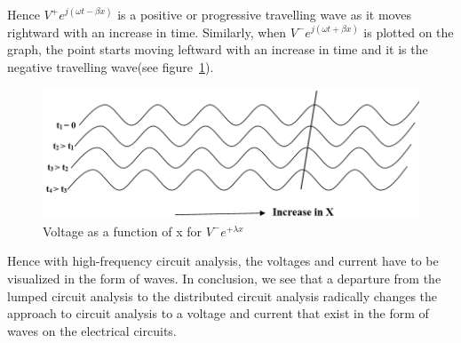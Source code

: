 Hence  $ V^{+}e^{j(\omega t- \beta x )} $ is a positive or progressive travelling wave as it moves rightward with an increase in time. Similarly, when $ V^{-}e^{j( \omega t+ \beta x )} $ is plotted on the graph, the point starts moving leftward with an increase in time and it is the negative travelling wave(see figure~\ref{fig:abcd}).
\begin{figure}[h]
\centering
\includegraphics[width=1\linewidth]{graphics/ABCD}
\caption{Voltage as a function of x for $V^-e^{+\lambda x}$}
\label{fig:abcd}
\end{figure}

Hence with high-frequency circuit analysis, the voltages and current have to be visualized in the form of waves. In conclusion, we see that a departure from the lumped circuit analysis to the distributed circuit analysis radically changes the approach to circuit analysis to a voltage and current that exist in the form of waves on the electrical circuits. 

